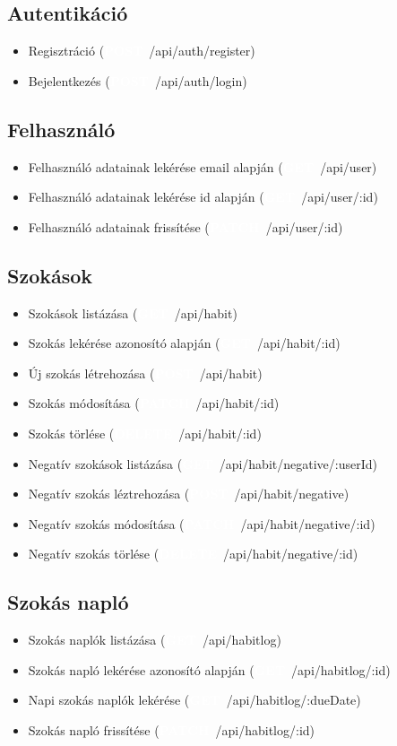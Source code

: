 \documentclass[12pt]{report}
\newcommand{\httpGet}[1]{\colorbox{getColor}{\textbf{\textcolor{white}{GET}}}~#1}
\newcommand{\httpPost}[1]{\colorbox{postColor}{\textbf{\textcolor{white}{POST}}}~#1}
\newcommand{\httpPatch}[1]{\colorbox{patchColor}{\textbf{\textcolor{white}{PATCH}}}~#1}
\newcommand{\httpDelete}[1]{\colorbox{deleteColor}{\textbf{\textcolor{white}{DELETE}}}~#1}
\begin{document}
\subsection{Autentikáció}
  \begin{itemize}
    \item Regisztráció (\httpPost{/api/auth/register})
    \item Bejelentkezés (\httpPost{/api/auth/login})
  \end{itemize}
\subsection{Felhasználó}
  \begin{itemize}
    \item Felhasználó adatainak lekérése email alapján (\httpGet{/api/user})
    \item Felhasználó adatainak lekérése id alapján (\httpGet{/api/user/:id})
    \item Felhasználó adatainak frissítése (\httpPatch{/api/user/:id})
  \end{itemize}
\subsection{Szokások}
  \begin{itemize}
    \item Szokások listázása (\httpGet{/api/habit})
    \item Szokás lekérése azonosító alapján (\httpGet{/api/habit/:id})
    \item Új szokás létrehozása (\httpPost{/api/habit})
    \item Szokás módosítása (\httpPatch{/api/habit/:id})
    \item Szokás törlése (\httpDelete{/api/habit/:id})
    \item Negatív szokások listázása (\httpGet{/api/habit/negative/:userId})
    \item Negatív szokás léztrehozása (\httpPost{/api/habit/negative})
    \item Negatív szokás módosítása (\httpPatch{/api/habit/negative/:id})
    \item Negatív szokás törlése (\httpDelete{/api/habit/negative/:id})
  \end{itemize}
\subsection{Szokás napló}
  \begin{itemize}
    \item Szokás naplók listázása (\httpGet{/api/habitlog})
    \item Szokás napló lekérése azonosító alapján (\httpGet{/api/habitlog/:id})
    \item Napi szokás naplók lekérése (\httpGet{/api/habitlog/:dueDate})
    \item Szokás napló frissítése (\httpPatch{/api/habitlog/:id})
  \end{itemize}
\end{document}
